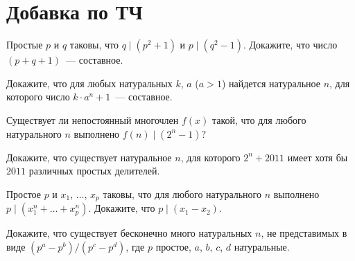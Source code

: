 

\section*{Добавка по ТЧ}


\begin{problems}

\item
Простые $p$ и $q$ таковы, что $q \mid (p^2 + 1)$ и $p \mid (q^2 - 1)$.
Докажите, что число $(p + q + 1)$~--- составное.

\item
Докажите, что для любых натуральных $k$, $a$ ($a > 1$) найдется натуральное $n$, для
которого число $k \cdot a^n + 1$~--- составное.

\item
Существует ли непостоянный многочлен $f(x)$ такой, что для любого натурального $n$
выполнено $f(n) \mid (2^n - 1)$?

\item
Докажите, что существует натуральное $n$, для которого $2^n + 2011$ имеет хотя бы
$2011$ различных простых делителей.

\item
Простое $p$ и $x_1$, $\ldots$, $x_p$ таковы, что для любого натурального $n$
выполнено $p \mid (x_1^n + \ldots + x_p^n)$.
Докажите, что $p \mid (x_1 - x_2)$.

\item
Докажите, что существует бесконечно много натуральных $n$, не представимых в виде
$(p^a - p^b) / (p^c - p^d)$,
где $p$ простое, $a$, $b$, $c$, $d$ натуральные.

\end{problems}

